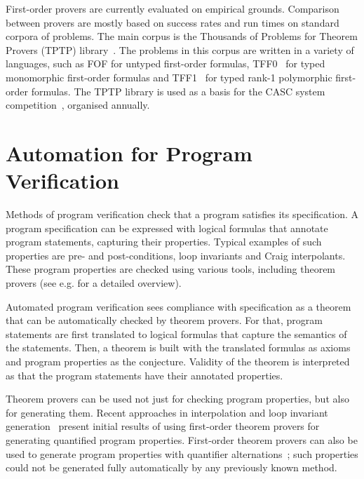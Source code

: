 First-order provers are currently evaluated on empirical grounds. Comparison between provers are mostly based on success rates and run times on standard corpora of problems. The main corpus is the Thousands of Problems for Theorem Provers (TPTP) library~\cite{TPTP}. The problems in this corpus are written in a variety of languages, such as FOF for untyped first-order formulas, TFF0~\cite{tff0} for typed monomorphic first-order formulas and TFF1~\cite{tff1} for typed rank-1 polymorphic first-order formulas. The TPTP library is used as a basis for the CASC system competition~\cite{CASC}, organised annually.




\section[Automation for Program Verification]{Automation for Program Verification}\label{sect:intro:analysis}
Methods of program verification check that a program satisfies its specification. A program specification can be expressed with logical formulas that annotate program statements, capturing their properties. Typical examples of such properties are pre- and post-conditions, loop invariants and Craig interpolants. These program properties are checked using various tools, including theorem provers (see e.g. \cite{Bonacina10} for a detailed overview).

Automated program verification sees compliance with specification as a theorem that can be automatically checked by theorem provers. For that, program statements are first translated to logical formulas that capture the semantics of the statements. Then, a theorem is built with the translated formulas as axioms and program properties as the conjecture. Validity of the theorem is interpreted as that the program statements have their annotated properties.

Theorem provers can be used not just for checking program properties, but also for generating them. Recent approaches in interpolation and loop invariant generation~\cite{McMillan08,fase2009,hoder2012popl} present initial results of using first-order theorem provers for generating quantified program properties. First-order theorem provers can also be used to generate program properties with quantifier alternations~\cite{fase2009}; such properties could not be generated fully automatically by any previously known method.

